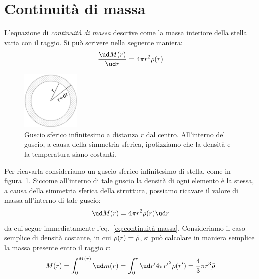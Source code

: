 \section{Continuità di massa}\label{sec:continuità-massa}
L'equazione di \emph{continuità di massa} descrive come la massa interiore della stella varia con il raggio. Si può scrivere nella seguente maniera:
\begin{equation}\label{eq:continuità-massa}
    \dfrac{\ud M(r)}{\ud r} = 4 \pi r^2 \rho(r)
\end{equation}

\begin{figure}
\centering
\includegraphics[width=0.25\textwidth]{immagini/continuita-massa.jpg}
\caption{Guscio sferico infinitesimo a distanza $r$ dal centro. All'interno del guscio, a causa della simmetria sferica, ipotizziamo che la densità e la temperatura siano costanti.}
\label{fig:continuità-massa}
\end{figure}

Per ricavarla consideriamo un guscio sferico infinitesimo di stella, come in figura~\ref{fig:continuità-massa}. Siccome all'interno di tale guscio la densità di ogni elemento è la stessa, a causa della simmetria sferica della struttura, possiamo ricavare il valore di massa all'interno di tale guscio:
\[
    \ud M(r) = 4 \pi r^2 \rho(r) \ud r
\]
da cui segue immediatamente l'eq.~\eqref{eq:continuità-massa}. Consideriamo il caso semplice di densità costante, in cui $\rho(r) = \Bar{\rho}$, si può calcolare in  maniera semplice la massa presente entro il raggio $r$:
\[
    M(r) = \int_0^{M(r)} \ud m(r) = \int_0^r \ud r' 4 \pi {r'}^2 \rho(r') = \frac{4}{3} \pi r^3 \Bar{\rho}
\]
